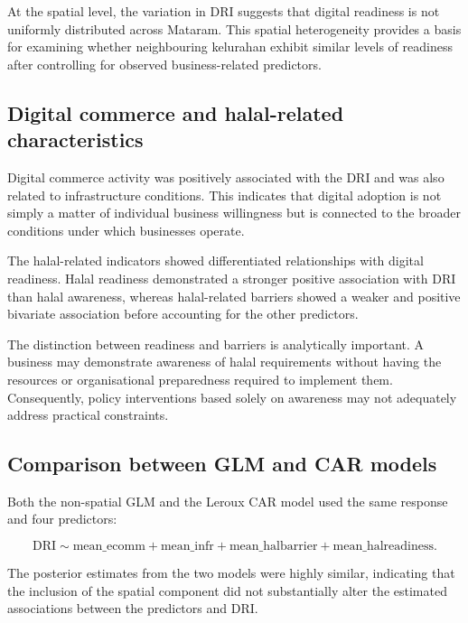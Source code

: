 \documentclass[
  default,
]{sn-jnl}
\begin{document}
At the spatial level, the variation in DRI suggests that digital
readiness is not uniformly distributed across Mataram. This spatial
heterogeneity provides a basis for examining whether neighbouring
kelurahan exhibit similar levels of readiness after controlling for
observed business-related predictors.

\subsection{Digital commerce and halal-related
characteristics}\label{digital-commerce-and-halal-related-characteristics}

Digital commerce activity was positively associated with the DRI and was
also related to infrastructure conditions. This indicates that digital
adoption is not simply a matter of individual business willingness but
is connected to the broader conditions under which businesses operate.

The halal-related indicators showed differentiated relationships with
digital readiness. Halal readiness demonstrated a stronger positive
association with DRI than halal awareness, whereas halal-related
barriers showed a weaker and positive bivariate association before
accounting for the other predictors.

The distinction between readiness and barriers is analytically
important. A business may demonstrate awareness of halal requirements
without having the resources or organisational preparedness required to
implement them. Consequently, policy interventions based solely on
awareness may not adequately address practical constraints.

\subsection{Comparison between GLM and CAR
models}\label{comparison-between-glm-and-car-models}

Both the non-spatial GLM and the Leroux CAR model used the same response
and four predictors:

\[
\mathrm{DRI}
\sim
\mathrm{mean\_ecomm}
+\mathrm{mean\_infr}
+\mathrm{mean\_halbarrier}
+\mathrm{mean\_halreadiness}.
\]

The posterior estimates from the two models were highly similar,
indicating that the inclusion of the spatial component did not
substantially alter the estimated associations between the predictors
and DRI.
\end{document}
